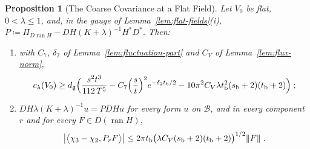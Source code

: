 \documentclass[11pt]{preprint}
\DeclarePairedDelimiter{\norm}{\lVert}{\rVert}
\numberwithin{equation}{section}
\newtheorem{proposition}[theorem]{Proposition}
\theoremstyle{definition}
\theoremstyle{remark}
\theoremstyle{plain}
\begin{document}
\begin{proposition}[The Coarse Covariance at a Flat Field]\label{prop:flat-covariance}
Let $V_0$ be flat, $0 < \lambda \leq 1$, and, in the gauge of Lemma~\ref{lem:flat-fields}(i), $P \coloneqq \Pi_{D\operatorname{ran}H} - DH(K + \lambda)^{-1}H^*D^*$. Then:
\begin{enumerate}[label=(\roman*)]
\item with $C_7$, $\delta_2$ of Lemma~\ref{lem:fluctuation-part} and $C_V$ of Lemma~\ref{lem:flux-norm},
\begin{equation}\label{eq:flat-covariance}
    c_\lambda(V_0) \geq d_{\mathfrak g}\Bigl(\frac{s^2t^3}{112\,T^5} - C_7\Bigl(\frac st\Bigr)^2e^{-\delta_2t_{\mathrm b}/2} - 10\pi^2C_V\lambda t_{\mathrm b}^2(s_{\mathrm b} + 2)(t_{\mathrm b} + 2)\Bigr)\;;
\end{equation}
\item $DH\lambda(K + \lambda)^{-1}u = PDHu$ for every form $u$ on $\mathcal B$, and in every component $r$ and for every $F \in D(\operatorname{ran}H)$,
\begin{equation}\label{eq:lambda-term-flat}
    \bigl\lvert\bigl\langle\chi_3 - \chi_2, P_rF\bigr\rangle\bigr\rvert \leq 2\pi t_{\mathrm b}\bigl(\lambda C_V(s_{\mathrm b} + 2)(t_{\mathrm b} + 2)\bigr)^{1/2}\norm F\;.
\end{equation}
\end{enumerate}
\end{proposition}
\end{document}
